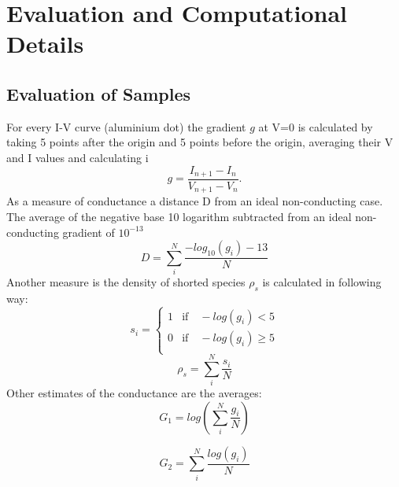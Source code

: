 \documentclass[a4paper]{article}
\begin{document}
\section{Evaluation and Computational Details}
\subsection{Evaluation of Samples}
\label{sec:eval}
For every I-V curve (aluminium dot) the gradient $g$ at V=0 is calculated by taking 5 points after the origin and 5 points before the origin, averaging their V and I values and calculating i
\begin{equation}
	g = \frac{I_{n+1} - I_n}{V_{n+1} - V_n}.
\end{equation}
As a measure of conductance a distance D from an ideal non-conducting case. The average of the negative base 10 logarithm subtracted from an ideal non-conducting gradient of $10^{-13}$ 
\begin{equation}
	D = \sum_i^N \frac{ -log_{10}(g_i) - 13}{N}
	\label{eq:D}
\end{equation}
Another measure is the density of shorted species $\rho_{s}$ is calculated in following way:
\begin{equation}
	s_i = \begin{cases}
	1 &\text{if} \quad -log(g_i) < 5 \\
	0 &\text{if} \quad -log(g_i) \geq 5 \\
	\end{cases}
\end{equation}
\begin{equation}
	\rho_s = \sum_i^N \frac{s_i}{N}
	\label{eq:rho}
\end{equation}
Other estimates of the conductance are the averages:
\begin{equation}
	G_1 = log \left( \sum_i^N \frac{g_i}{N} \right)
\end{equation}

\begin{equation}
	G_2 =  \sum_i^N \frac{log(g_i)}{N}
\end{equation}
\end{document}
